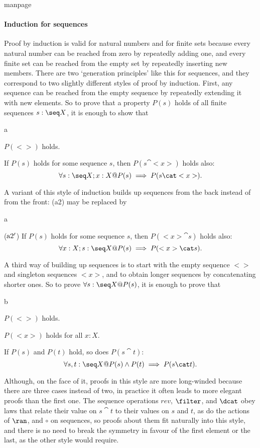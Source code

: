 \begin{pagestyle}{manpage}\label{p:4100}
\paragraph{Induction for sequences}

Proof by induction
is valid for natural numbers and for finite
sets because every natural number can be reached from zero by
repeatedly adding one, and every finite set can be reached from
the empty set by repeatedly inserting new members. There are two
`generation principles'
like this for sequences, and they correspond
to two slightly different styles of proof by induction.
First, any sequence can be reached from the empty sequence by
repeatedly extending it with new elements. So to prove that a
property $P(s)$ holds of all finite sequences $s: \seq X$, it is
enough to show that
\begin{oblig}{a}
\item $P(<>)$ holds.

\item If $P(s)$ holds for some sequence $s$, then
        $P(s\cat<x>)$ holds also:
        \[ \forall s: \seq X; x: X @ %
                P(s) \implies P(s\cat<x>). \]
\end{oblig}
A variant of this style of induction builds up sequences from
the back instead of from the front: (a2) may be replaced by
\begin{oblig}{a}
\item[($\rm a2'$)] If $P(s)$ holds for some sequence $s$,
        then $P(<x>\cat s)$ holds also:
        \[ \forall x: X; s: \seq X @ %
                P(s) \implies P(<x>\cat s). \]
\end{oblig}

A third way of building up sequences is to start with the empty
sequence $<>$ and singleton sequences $<x>$,
and to obtain longer sequences by concatenating shorter ones.
So to prove $\forall s: \seq X @ P(s)$, it is enough to prove that
\begin{oblig}{b}
\item $P(<>)$ holds.
\item $P(<x>)$ holds for all $x: X$.
\item If $P(s)$ and $P(t)$ hold, so does $P(s\cat t)$:
        \[ \forall s, t: \seq X @ P(s) \land P(t) 
		\implies P(s \cat t). \]
\end{oblig}

Although, on the face of it, proofs in this style are more
long-winded because there are three cases instead of two, in
practice it often leads to more elegant proofs than the first one.
The sequence operations $rev$, $\filter$, and $\dcat$ obey laws that
relate their value on $s \cat t$ to their values on $s$ and $t$, as
do the actions of $\ran$, and $\circ$ on sequences, so proofs about
them fit naturally into this style, and there is no need to break
the symmetry in favour of the first element or the last, as the
other style would require.
\newpage
\end{pagestyle}
